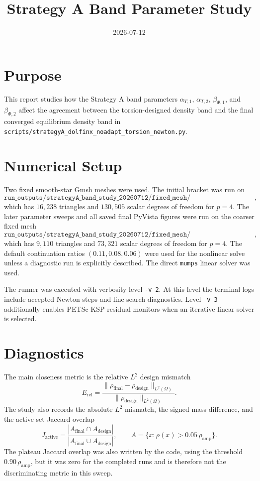 \documentclass[11pt]{article}
\title{Strategy A Band Parameter Study}
\author{}
\date{2026-07-12}
\begin{document}
\maketitle

\section{Purpose}

This report studies how the Strategy A band parameters
\(\alpha_{T,1}\), \(\alpha_{T,2}\), \(\beta_{\Phi,1}\), and
\(\beta_{\Phi,2}\) affect the agreement between the torsion-designed density
band and the final converged equilibrium density band in
\texttt{scripts/strategyA\_dolfinx\_noadapt\_torsion\_newton.py}.

\section{Numerical Setup}

Two fixed smooth-star Gmsh meshes were used.  The initial bracket was run on
\[
\texttt{run\_outputs/strategyA\_band\_study\_20260712/fixed\_mesh/smooth\_star\_h007\_n300.msh},
\]
which has \(16{,}238\) triangles and \(130{,}505\) scalar degrees of freedom
for \(p=4\).  The later parameter sweeps and all saved final PyVista figures
were run on the coarser fixed mesh
\[
\texttt{run\_outputs/strategyA\_band\_study\_20260712/fixed\_mesh/smooth\_star\_h010\_n220.msh},
\]
which has \(9{,}110\) triangles and \(73{,}321\) scalar degrees of freedom for
\(p=4\).  The default continuation ratios \((0.11,0.08,0.06)\) were used for
the nonlinear solve unless a diagnostic run is explicitly described.  The
direct \texttt{mumps} linear solver was used.

The runner was executed with verbosity level \texttt{-v 2}.  At this level the
terminal logs include accepted Newton steps and line-search diagnostics.  Level
\texttt{-v 3} additionally enables PETSc KSP residual monitors when an
iterative linear solver is selected.

\section{Diagnostics}

The main closeness metric is the relative \(L^2\) design mismatch
\[
E_{\mathrm{rel}}
 =
\frac{\|\rho_{\mathrm{final}}-\rho_{\mathrm{design}}\|_{L^2(\Omega)}}
     {\|\rho_{\mathrm{design}}\|_{L^2(\Omega)}}.
\]
The study also records the absolute \(L^2\) mismatch, the signed mass
difference, and the active-set Jaccard overlap
\[
J_{\mathrm{active}}
=
\frac{|A_{\mathrm{final}}\cap A_{\mathrm{design}}|}
     {|A_{\mathrm{final}}\cup A_{\mathrm{design}}|},
\qquad
A = \{x : \rho(x) > 0.05\,\rho_{\mathrm{amp}}\}.
\]
The plateau Jaccard overlap was also written by the code, using the threshold
\(0.90\,\rho_{\mathrm{amp}}\), but it was zero for the completed runs and is
therefore not the discriminating metric in this sweep.
\end{document}
